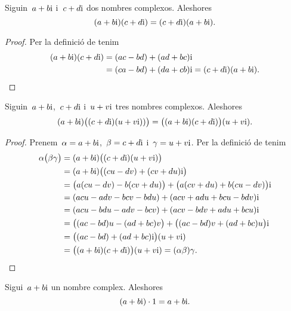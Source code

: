 \documentclass[../analisi-complexa.tex]{subfiles}
\begin{document}
    \begin{proposition}
        \label{prop:els-nombres-complexos-commuten-pel-producte}
        Siguin~\(a+b\mathrm{i}\) i~\(c+d\mathrm{i}\) dos nombres complexos.
        Aleshores
        \[
            (a+b\mathrm{i})(c+d\mathrm{i}) = (c+d\mathrm{i})(a+b\mathrm{i}).
        \]
    \end{proposition}
    \begin{proof}
        Per la definició de  tenim
        \begin{align*}
            (a+b\mathrm{i})(c+d\mathrm{i}) &= (ac-bd)+(ad+bc)\mathrm{i} \\
             &= (ca-bd)+(da+cb)\mathrm{i} = (c+d\mathrm{i})(a+b\mathrm{i}).\qedhere
        \end{align*}
    \end{proof}
    \begin{proposition}
        \label{prop:els-nombres-complexos-son-associatius-pel-producte}
        Siguin~\(a+b\mathrm{i}\),~\(c+d\mathrm{i}\) i~\(u+v\mathrm{i}\) tres nombres complexos.
        Aleshores
        \[
            (a+b\mathrm{i})\big((c+d\mathrm{i})(u+v\mathrm{i}))\big)
            = \big((a+b\mathrm{i})(c+d\mathrm{i})\big)(u+v\mathrm{i}).
        \]
    \end{proposition}
    \begin{proof}
        Prenem~\(\alpha = a+b\mathrm{i}\),~\(\beta = c+d\mathrm{i}\)
        i~\(\gamma = u+v\mathrm{i}\).
        Per la definició de  tenim
        \begin{align*}
            \alpha\big(\beta\gamma\big)
                &= (a+b\mathrm{i})\big((c+d\mathrm{i})(u+v\mathrm{i})\big) \\
                &= (a+b\mathrm{i})\big((cu-dv)+(cv+du)\mathrm{i}\big) \\
                &= \big(a(cu-dv)-b(cv+du)\big)
                   +\big(a(cv+du)+b(cu-dv)\big)\mathrm{i} \\
                &= (acu-adv-bcv-bdu)+(acv+adu+bcu-bdv)\mathrm{i} \\
                &= (acu-bdu-adv-bcv)+(acv-bdv+adu+bcu)\mathrm{i} \\
                &= \big((ac-bd)u-(ad+bc)v\big)
                   +\big((ac-bd)v+(ad+bc)u\big)\mathrm{i} \\
                &= \big((ac-bd)+(ad+bc)\mathrm{i}\big)(u+v\mathrm{i}) \\
                &= \big((a+b\mathrm{i})(c+d\mathrm{i})\big)(u+v\mathrm{i})
                 = (\alpha\beta)\gamma.\qedhere
        \end{align*}
    \end{proof}
    \begin{proposition}
        \label{prop:element-neutre-pel-producte-dels-complexos}
        Sigui~\(a+b\mathrm{i}\) un nombre complex.
        Aleshores
        \[
            (a+b\mathrm{i})\cdot1 = a+b\mathrm{i}.
        \]
    \end{proposition}
\end{document}
